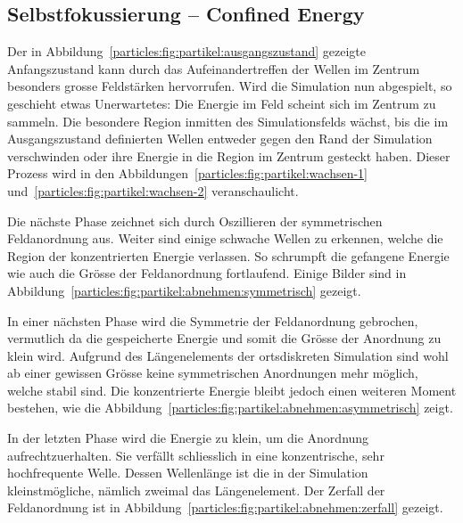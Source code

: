 \subsection{Selbstfokussierung -- Confined Energy}


Der in Abbildung~\ref{particles:fig:partikel:ausgangszustand} gezeigte Anfangszustand kann durch das Aufeinandertreffen der Wellen im Zentrum besonders grosse Feldstärken hervorrufen.
Wird die Simulation nun abgespielt, so geschieht etwas Unerwartetes: Die Energie im Feld scheint sich im Zentrum zu sammeln.
Die besondere Region inmitten des Simulationsfelds wächst, 
bis die im Ausgangszustand definierten Wellen entweder gegen den Rand der Simulation verschwinden oder ihre Energie in die Region im Zentrum gesteckt haben.
Dieser Prozess wird in den Abbildungen~\ref{particles:fig:partikel:wachsen-1} und~\ref{particles:fig:partikel:wachsen-2} veranschaulicht.


Die nächste Phase zeichnet sich durch Oszillieren der symmetrischen Feldanordnung aus. 
Weiter sind einige schwache Wellen zu erkennen, welche die Region der konzentrierten Energie verlassen.
So schrumpft die gefangene Energie wie auch die Grösse der Feldanordnung fortlaufend.
Einige Bilder sind in Abbildung~\ref{particles:fig:partikel:abnehmen:symmetrisch} gezeigt.


In einer nächsten Phase wird die Symmetrie der Feldanordnung gebrochen, 
vermutlich da die gespeicherte Energie und somit die Grösse der Anordnung zu klein wird.
Aufgrund des Längenelements der ortsdiskreten Simulation sind wohl ab einer gewissen Grösse keine symmetrischen Anordnungen mehr möglich, welche stabil sind.
Die konzentrierte Energie bleibt jedoch einen weiteren Moment bestehen, 
wie die Abbildung~\ref{particles:fig:partikel:abnehmen:asymmetrisch} zeigt.


In der letzten Phase wird die Energie zu klein, um die Anordnung aufrechtzuerhalten. 
Sie verfällt schliesslich in eine konzentrische, sehr hochfrequente Welle. 
Dessen Wellenlänge ist die in der Simulation kleinstmögliche, nämlich zweimal das Längenelement.
Der Zerfall der Feldanordnung ist in Abbildung~\ref{particles:fig:partikel:abnehmen:zerfall} gezeigt.


